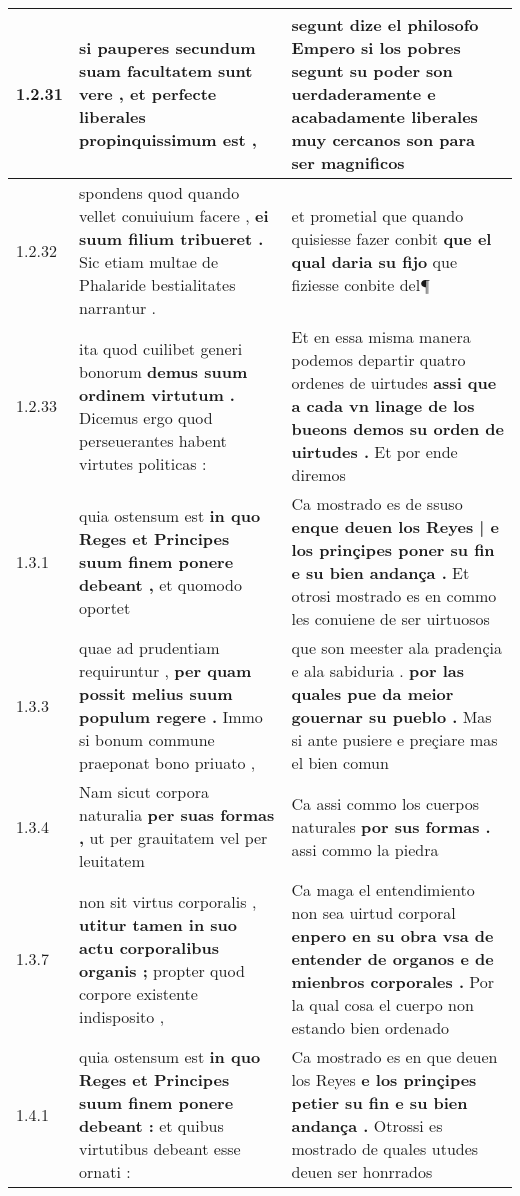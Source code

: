 \begin{tabular}{|p{1cm}|p{6.5cm}|p{6.5cm}|}
1.2.31 & si pauperes \textbf{ secundum suam facultatem sunt vere , } et perfecte liberales propinquissimum est , & segunt dize el philosofo \textbf{ Empero si los pobres segunt su poder son uerdaderamente } e acabadamente liberales muy cercanos son para ser magnificos \\\hline
1.2.32 & spondens quod quando vellet conuiuium facere , \textbf{ ei suum filium tribueret . } Sic etiam multae de Phalaride bestialitates narrantur . & et prometial que quando quisiesse fazer conbit \textbf{ que el qual daria su fijo } que fiziesse conbite del¶ \\\hline
1.2.33 & ita quod cuilibet generi bonorum \textbf{ demus suum ordinem virtutum . } Dicemus ergo quod perseuerantes habent virtutes politicas : & Et en essa misma manera podemos departir quatro ordenes de uirtudes \textbf{ assi que a cada vn linage de los bueons demos su orden de uirtudes . } Et por ende diremos \\\hline
1.3.1 & quia ostensum est \textbf{ in quo Reges et Principes suum finem ponere debeant , } et quomodo oportet & Ca mostrado es de ssuso \textbf{ enque deuen los Reyes | e los prinçipes poner su fin e su bien andança . } Et otrosi mostrado es en commo les conuiene de ser uirtuosos \\\hline
1.3.3 & quae ad prudentiam requiruntur , \textbf{ per quam possit melius suum populum regere . } Immo si bonum commune praeponat bono priuato , & que son meester ala pradençia e ala sabiduria . \textbf{ por las quales pue da meior gouernar su pueblo . } Mas si ante pusiere e preçiare mas el bien comun \\\hline
1.3.4 & Nam sicut corpora naturalia \textbf{ per suas formas , } ut per grauitatem vel per leuitatem & Ca assi commo los cuerpos naturales \textbf{ por sus formas . } assi commo la piedra \\\hline
1.3.7 & non sit virtus corporalis , \textbf{ utitur tamen in suo actu corporalibus organis ; } propter quod corpore existente indisposito , & Ca maga el entendimiento non sea uirtud corporal \textbf{ enpero en su obra vsa de entender de organos e de mienbros corporales . } Por la qual cosa el cuerpo non estando bien ordenado \\\hline
1.4.1 & quia ostensum est \textbf{ in quo Reges et Principes suum finem ponere debeant : } et quibus virtutibus debeant esse ornati : & Ca mostrado es en que deuen los Reyes \textbf{ e los prinçipes petier su fin e su bien andança . } Otrossi es mostrado de quales utudes deuen ser honrrados \\\hline

\end{tabular}
